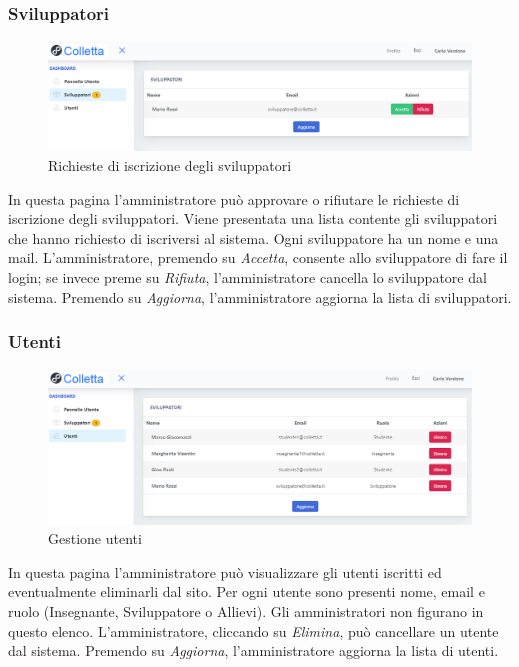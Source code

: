 		\subsubsection{Sviluppatori}
			\begin{figure}[H]
				\centering
				\includegraphics[width=17cm]{sez/img/amministratore/conf_ric_svil.PNG}
				\caption{Richieste di iscrizione degli sviluppatori}\label{fig:1}
			\end{figure}
		  In questa pagina l'amministratore può approvare o rifiutare le richieste di iscrizione degli sviluppatori. Viene presentata una lista contente gli sviluppatori che hanno richiesto di iscriversi al sistema. Ogni sviluppatore ha un nome e una mail. L'amministratore, premendo su \textit{Accetta}, consente allo sviluppatore di fare il login; se invece preme su \textit{Rifiuta}, l'amministratore cancella lo sviluppatore dal sistema. Premendo su \textit{Aggiorna}, l'amministratore aggiorna la lista di sviluppatori.


		\subsubsection{Utenti}
			\begin{figure}[H]
				\centering
				\includegraphics[width=17cm]{sez/img/amministratore/gestisciutenti.PNG}
				\caption{Gestione utenti}\label{fig:1}
			\end{figure}
		  In questa pagina l'amministratore può visualizzare gli utenti iscritti ed eventualmente eliminarli dal sito. Per ogni utente sono presenti nome, email e ruolo (Insegnante, Sviluppatore o Allievi). Gli amministratori non figurano in questo elenco. L'amministratore, cliccando su \textit{Elimina}, può cancellare un utente dal sistema. Premendo su \textit{Aggiorna}, l'amministratore aggiorna la lista di utenti.
